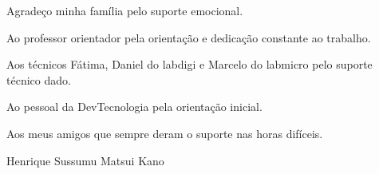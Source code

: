 \begin{agradecimentos}
\vspace{10mm}
\large
Agradeço minha família pelo suporte emocional.

Ao professor orientador pela orientação e dedicação constante ao trabalho.

Aos técnicos Fátima, Daniel do labdigi e Marcelo do labmicro pelo suporte técnico dado.

Ao pessoal da DevTecnologia pela orientação inicial.

Aos meus amigos que sempre deram o suporte nas horas difíceis.

\vfill
Henrique Sussumu Matsui Kano
\end{agradecimentos}
